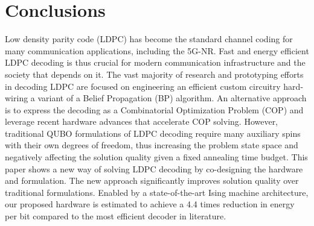 \section{Conclusions}\label{sec:conclusion}

Low density parity code (LDPC) has become the standard channel coding for many communication applications, including the 5G-NR. Fast and energy efficient LDPC decoding is thus crucial for  modern communication infrastructure and the society that depends on it. The vast majority of research and prototyping efforts in decoding LDPC are focused on engineering an efficient custom circuitry hard-wiring a variant of a Belief Propagation (BP) algorithm. An alternative approach is to express the decoding as a Combinatorial Optimization Problem (COP) and leverage recent hardware advances that accelerate COP solving. However, traditional QUBO formulations of LDPC
decoding require many auxiliary spins with their own degrees of freedom, thus
increasing the problem state space and negatively affecting the solution quality given a
fixed annealing time budget.
This paper shows a new way of solving LDPC decoding by co-designing the hardware and formulation.
The new approach significantly improves solution quality over traditional formulations.
Enabled by a state-of-the-art Ising machine architecture, our proposed hardware is estimated
to achieve a 4.4 times reduction in energy per bit compared to the most efficient
decoder in literature. 


